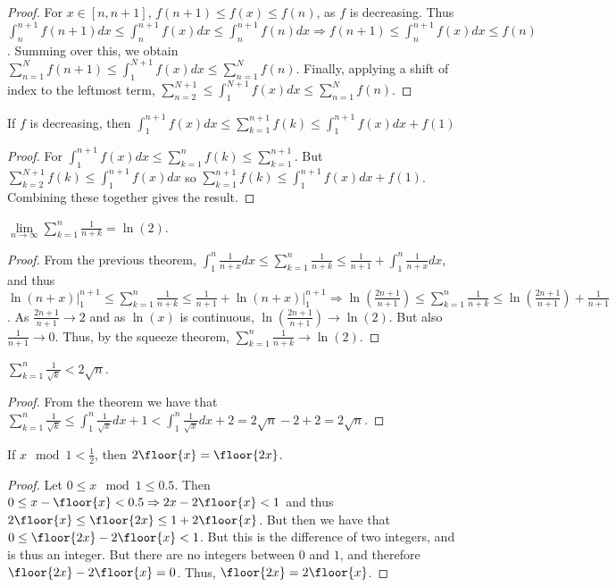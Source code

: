 \documentclass[crop=false,class=book]{standalone}
\begin{document}
\begin{proof}
For $x\in [n,n+1]$, $f(n+1)\leq f(x)\leq f(n)$, as $f$ is decreasing. Thus $\int_{n}^{n+1} f(n+1)dx \leq \int_{n}^{n+1} f(x) dx \leq \int_{n}^{n+1} f(n)dx \Rightarrow f(n+1) \leq \int_{n}^{n+1}f(x)dx \leq f(n)$. Summing over this, we obtain $\sum_{n=1}^{N} f(n+1) \leq \int_{1}^{N+1} f(x) dx \leq \sum_{n=1}^{N} f(n)$. Finally, applying a shift of index to the leftmost term, $\sum_{n=2}^{N+1} \leq \int_{1}^{N+1}f(x)dx \leq \sum_{n=1}^{N} f(n)$. 
\end{proof}
\begin{corollary}
If $f$ is decreasing, then $\int_{1}^{n+1} f(x)dx \leq \sum_{k=1}^{n+1} f(k) \leq \int_{1}^{n+1} f(x)dx + f(1)$
\end{corollary}
\begin{proof}
For $\int_{1}^{n+1}f(x) dx \leq \sum_{k=1}^{n}f(k)\leq \sum_{k=1}^{n+1}$. But $\sum_{k=2}^{N+1} f(k) \leq \int_{1}^{n+1}f(x)dx$ so $\sum_{k=1}^{n+1}f(k) \leq \int_{1}^{n+1}f(x)dx +f(1)$. Combining these together gives the result.
\end{proof}
\begin{theorem}
$\underset{n\rightarrow \infty}\lim \sum_{k=1}^{n} \frac{1}{n+k} = \ln(2)$.
\end{theorem}
\begin{proof}
From the previous theorem, $\int_{1}^{n} \frac{1}{n+x} dx \leq \sum_{k=1}^{n} \frac{1}{n+k} \leq \frac{1}{n+1} + \int_{1}^{n} \frac{1}{n+x}dx$, and thus $\ln(n+x)\big|_{1}^{n+1} \leq \sum_{k=1}^{n} \frac{1}{n+k}\leq \frac{1}{n+1}+\ln(n+x)\big|_{1}^{n+1}\Rightarrow \ln(\frac{2n+1}{n+1})\leq \sum_{k=1}^{n} \frac{1}{n+k} \leq \ln(\frac{2n+1}{n+1})+\frac{1}{n+1}$. As $\frac{2n+1}{n+1}\rightarrow 2$ and as $\ln(x)$ is continuous, $\ln(\frac{2n+1}{n+1})\rightarrow \ln(2)$. But also $\frac{1}{n+1}\rightarrow 0$. Thus, by the squeeze theorem, $\sum_{k=1}^{n} \frac{1}{n+k} \rightarrow \ln(2)$.
\end{proof}
\begin{corollary}
$\sum_{k=1}^{n}\frac{1}{\sqrt{k}}< 2\sqrt{n}$.
\end{corollary}
\begin{proof}
From the theorem we have that $\sum_{k=1}^{n} \frac{1}{\sqrt{k}} \leq \int_{1}^{n}\frac{1}{\sqrt{x}}dx + 1 < \int_{1}^{n} \frac{1}{\sqrt{x}}dx +2 = 2\sqrt{n}-2+2 = 2\sqrt{n}$.
\end{proof}
\begin{lemma}
If $x\mod 1 < \frac{1}{2}$, then $2\floor{x} = \floor{2x}$.
\end{lemma}
\begin{proof}
Let $0\leq x \mod 1 \leq 0.5$. Then $0 \leq x-\floor{x}<0.5 \Rightarrow 2x-2\floor{x} <1$ and thus $2\floor{x} \leq \floor{2x} \leq 1+2\floor{x}$. But then we have that $0 \leq \floor{2x}-2\floor{x} <1$. But this is the difference of two integers, and is thus an integer. But there are no integers between $0$ and $1$, and therefore $\floor{2x}-2\floor{x} = 0$. Thus, $\floor{2x}=2\floor{x}$.
\end{proof}
\end{document}

